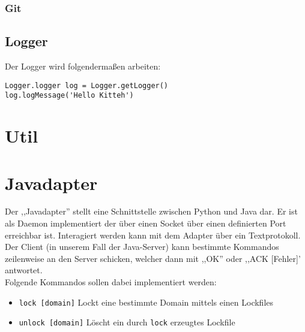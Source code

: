 \subsubsection{Git}
\label{ssub:git}




\subsection{Logger}
\label{sub:logger}
Der Logger wird folgendermaßen arbeiten:
\begin{verbatim}
Logger.logger log = Logger.getLogger()
log.logMessage('Hello Kitteh')
\end{verbatim}


\section{Util} 
\label{sec:util}



\section{Javadapter} 
\label{sec:javadapter}
Der ,,Javadapter'' stellt eine Schnittstelle zwischen Python und Java dar. Er ist als Daemon implementiert der über einen Socket über einen definierten Port
erreichbar ist. Interagiert werden kann mit dem Adapter über ein Textprotokoll. Der Client (in unserem Fall der Java-Server) kann bestimmte Kommandos
zeilenweise an den Server schicken, welcher dann mit ,,OK'' oder ,,ACK [Fehler]' antwortet.
\\
Folgende Kommandos sollen dabei implementiert werden:
\begin{itemize}
    \item \texttt{lock [domain]}
        Lockt eine bestimmte Domain mittels einen Lockfiles
    \item \texttt{unlock [domain]}
        Löscht ein durch \texttt{lock} erzeugtes Lockfile
\end{itemize}
